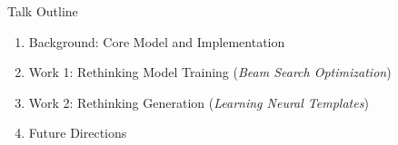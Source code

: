 
\begin{frame}{Talk Outline}
  \begin{enumerate}
  \item Background: Core Model and Implementation
    \air
  \item Work 1: Rethinking Model Training (\textit{Beam Search Optimization})
    \air

  \item Work 2: Rethinking  Generation  (\textit{Learning Neural Templates})
    \air

  \item Future Directions
  \end{enumerate}
\end{frame}











